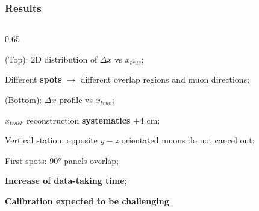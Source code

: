 \documentclass{beamer}
\begin{document}
\begin{frame}
    \frametitle{Results}

    \begin{columns}
\begin{column}{0.65\framewidth}
\vspace{-8mm}
   \setlength{\leftmargini}{1.2em}
      \begin{itemize}
 {\footnotesize
    \item (Top): 2D distribution of $\Delta x$ vs $x_{true}$;
    \vspace{4mm}
    \item Different \textbf{spots} $\rightarrow$ different overlap regions and muon directions;
    \vspace{4mm}
    \item (Bottom): $\Delta x$ profile vs $x_{true}$;
    \vspace{4mm}
    \item $x_{track}$ reconstruction \textbf{systematics} $\pm$4 cm;
    \vspace{4mm}
    \item Vertical station: opposite $y-z$ orientated muons do not cancel out;
    \vspace{4mm}
        \item First spots: 90° panels overlap;
        \vspace{4mm}
    \item \textbf{Increase of data-taking time};
    \vspace{4mm}
\item \textbf{Calibration expected to be challenging}. 
}


\end{itemize}
\end{column}
\end{columns}
\end{frame}
\end{document}
